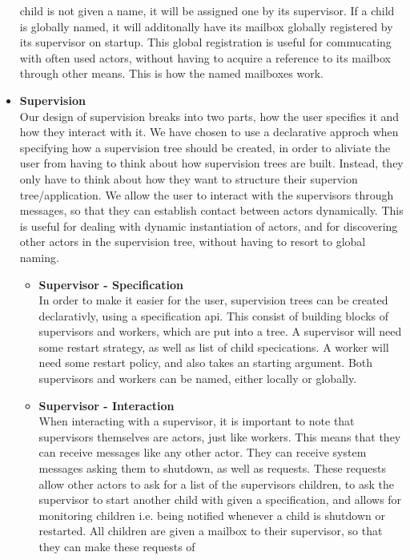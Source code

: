 \documentclass[a4paper]{article}
\begin{document}
\begin{itemize}
  child is not given a name, it will be assigned one by its supervisor. If a
  child is  globally named, it will additonally have its mailbox globally
  registered by  its supervisor on startup. This global registration is useful
  for commucating with often used actors, without having to acquire a reference
  to its mailbox through other means. This is how the named mailboxes work.
\item \textbf{Supervision}\\
  Our design of supervision breaks into two parts, how the user specifies it and
  how they interact with it. We have chosen to use a declarative approch when
  specifying how a supervision tree should be created, in order to aliviate the
  user from having to think about how supervision trees are built. Instead, they
  only have to think about how they want to structure their supervion
  tree/application. We allow the user to interact with the supervisors through
  messages, so that they can establish contact between actors dynamically. This
  is useful for dealing with dynamic instantiation of actors, and for discovering
  other actors in the supervision tree, without having to resort to global
  naming.
  \begin{itemize}
  \item \textbf{Supervisor - Specification}\\
    In order to make it easier for the user, supervision trees can be created
    declarativly, using a specification api. This consist of building blocks of
    supervisors and workers, which are put into a tree.
    A supervisor will need some restart strategy, as well as list of child
    specications. A worker will need some restart policy, and also takes an
    starting argument. Both supervisors and workers can be named, either locally
    or globally.
  \item \textbf{Supervisor - Interaction}\\
    When interacting with a supervisor, it is important to note that supervisors
    themselves are actors, just like workers. This means that they can receive
    messages like any other actor. They can receive system messages asking them to
    shutdown, as well as requests. These requests allow other actors to ask for a
    list of the supervisors children, to ask the supervisor to start another
    child with given a specification, and allows for monitoring children i.e.
    being notified whenever a child is shutdown or restarted. All children are
    given a mailbox to their supervisor, so that they can make these requests of

\end{itemize}
\end{itemize}
\end{document}
